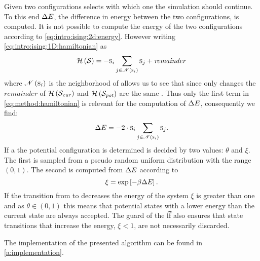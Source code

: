 Given two configurations  selects with which one the simulation should continue. To this end $\Delta E$, the difference in energy between the two configurations, is computed. It is not possible to compute the energy of the two configurations according to \cref{eq:intro:ising:2d:energy}. However writing \cref{eq:intro:ising:1D:hamiltonian} as
	\begin{equation}\label{eq:method:hamiltonian}
			\mathcal{H}\left(\mathcal{S}_{}\right) = - \textsc{s}_{i} \sum_{j \in \mathscr{N}\left(\textsc{s}_{i}\right)} \textsc{s}_{j} + \mathit{remainder}
	\end{equation}
where $\mathscr{N}\left(\textsc{s}_{i}\right)$ is the neighborhood of  allows us to see that since only  changes the $\mathit{remainder}$ of $\mathcal{H}\left(\mathcal{S}_{\mathit{cur}}\right)$ and $\mathcal{H}\left(\mathcal{S}_{\mathit{pot}}\right)$ are the same \cite{kenzel1997physics}. Thus only the first term in \cref{eq:method:hamiltonian} is relevant for the computation of $\Delta E$, consequently we find:
\begin{equation}\label{eq:method:deltaEnergy}
	\Delta E = - 2 \cdot \textsc{s}_{i} \sum_{j \in \mathscr{N}\left(\textsc{s}_{i}\right)} \textsc{s}_{j}.
\end{equation}
If a the potential configuration is determined is decided by two values: $\theta$ and $\xi$. The first is sampled from a pseudo random uniform distribution with the range $\left(0, 1\right)$. The second is computed from $\Delta E$ according to
\begin{equation}
	\xi = \exp\left[- \beta\Delta E \right].
\end{equation}
If the transition from  to  decreases the energy of the system $\xi$ is greater than one and as \mbox{$\theta \in \left(0, 1\right)$} this means that potential states with a lower energy than the current state are always accepted. The guard of the \t{if} also ensures that state transitions that increase the energy, \ie \mbox{$\xi < 1$}, are not necessarily discarded.

The implementation of the presented algorithm can be found in \cref{a:implementation}. 